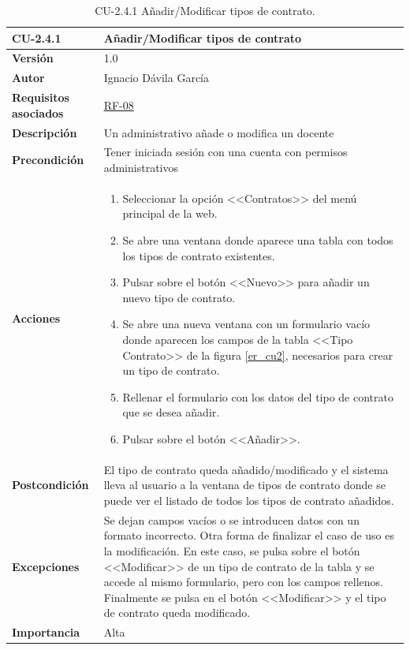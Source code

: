 \begin{table}[p]
\label{table:CU-2.4.1}
	\centering
	\begin{tabularx}{\linewidth}{ p{} p{} }
		\toprule
		\textbf{CU-2.4.1}    & \textbf{Añadir/Modificar tipos de contrato}\\
		\toprule
		\textbf{Versión}              & 1.0    \\
		\textbf{Autor}                & Ignacio Dávila García \\
		\textbf{Requisitos asociados} & \hyperref[itm:RF8]{RF-08} \\
		\textbf{Descripción}          & Un administrativo añade o modifica un docente \\
		\textbf{Precondición}         & Tener iniciada sesión con una cuenta con permisos administrativos \\
		\textbf{Acciones}             &
		\begin{enumerate}
			\def\labelenumi{\arabic{enumi}.}
			\tightlist
			\item Seleccionar la opción <<Contratos>> del menú principal de la web.
			\item Se abre una ventana donde aparece una tabla con todos los tipos de contrato existentes.
			\item Pulsar sobre el botón <<Nuevo>> para añadir un nuevo tipo de contrato.
			\item Se abre una nueva ventana con un formulario vacío donde aparecen los campos de la tabla <<Tipo Contrato>> de la figura \ref{er_cu2}, necesarios para crear un tipo de contrato.
			\item Rellenar el formulario con los datos del tipo de contrato que se desea añadir.
			\item Pulsar sobre el botón <<Añadir>>.
		\end{enumerate}\\
		\textbf{Postcondición}        & El tipo de contrato queda añadido/modificado y el sistema lleva al usuario a la ventana de tipos de contrato donde se puede ver el listado de todos los tipos de contrato añadidos. \\
		\textbf{Excepciones}          & Se dejan campos vacíos o se introducen datos con un formato incorrecto. Otra forma de finalizar el caso de uso es la modificación. En este caso, se pulsa sobre el botón <<Modificar>> de un tipo de contrato de la tabla y se accede al mismo formulario, pero con los campos rellenos. Finalmente se pulsa en el botón <<Modificar>> y el tipo de contrato queda modificado. \\
		\textbf{Importancia}          & Alta \\
		\bottomrule
	\end{tabularx}
	\caption{CU-2.4.1 Añadir/Modificar tipos de contrato.}
\end{table}
\FloatBarrier

